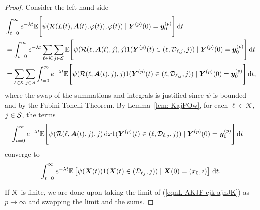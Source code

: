 \begin{proof}
	Consider the left-hand side 
	\begin{align}
		&\int_{t=0}^\infty e^{-\lambda t}\mathbb E\Bigg[\psi( \mathcal R(L(t),\boldsymbol A(t),\varphi(t)),\varphi(t) )   \mid 
		  \boldsymbol Y^{(p)}(0)=\boldsymbol y_0^{(p)} \Bigg] \, \mathrm{d} t \nonumber 
		\\&= \int_{t=0}^\infty e^{-\lambda t}\sum_{\ell\in\mathcal K}\sum_{j\in\mathcal S}\mathbb E\Bigg[\psi( \mathcal R(\ell,\boldsymbol A(t),j),j )  1({\boldsymbol Y}^{(p)}(t)\in(\ell,\mathcal D_{\ell,j},j))  \mid \nonumber
		 \boldsymbol Y^{(p)}(0)=\boldsymbol y_0^{(p)} \Bigg] \, \mathrm{d} t \nonumber 
		\\&= \sum_{\ell\in\mathcal K}\sum_{j\in\mathcal S}\int_{t=0}^\infty e^{-\lambda t}\mathbb E\Bigg[ \psi( \mathcal R(\ell,\boldsymbol A(t),j),j )1({\boldsymbol Y}^{(p)}(t)\in(\ell,\mathcal D_{\ell,j},j))  \mid 
		 \boldsymbol Y^{(p)}(0)=\boldsymbol y_0^{(p)} \Bigg] \, \mathrm{d} t, \label{eqnL AKJF cjk ajhJK}
	\end{align}
	where the swap of the summations and integrals is justified since \(\psi\) is bounded and by the Fubini-Tonelli Theorem. By Lemma~\ref{lem: KajPOw}, for each \(\ell\in\mathcal K\), \(j\in\mathcal{S}\), the terms 
	 \begin{align}
	 	&\int_{t=0}^\infty e^{-\lambda t}\mathbb E\Bigg[\psi( \mathcal R(\ell,\boldsymbol A(t),j), j )\, \mathrm{d} x 1({\boldsymbol Y}^{(p)}(t)\in(\ell,\mathcal D_{\ell,j},j))  \mid \nonumber
		 \boldsymbol Y^{(p)}(0)=\boldsymbol y_0^{(p)} \Bigg] \, \mathrm{d} t
	\end{align}
		converge to 
	\[\int_{t=0}^\infty e^{-\lambda t}  \mathbb E\left[\psi({\boldsymbol X}(t) )1(\boldsymbol X(t)\in(\mathcal D_{\ell_j},j))\mid \boldsymbol X(0)=(x_0,i) \right] \, \mathrm{d} t.\]
	
	If \(\mathcal K\) is finite, we are done upon taking the limit of (\ref{eqnL AKJF cjk ajhJK}) as \(p\to\infty\) and swapping the limit and the sums. 
	

\end{proof}
